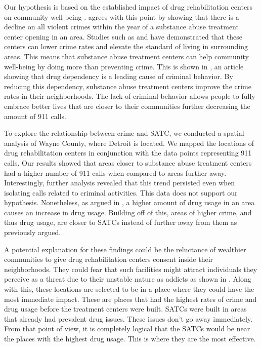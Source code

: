 \documentclass[12pt]{article}
\begin{document}
Our hypothesis is based on the established impact of drug rehabilitation centers on community well-being . \cite{SAT_centers_and_crime} agrees with this point by showing that there is a decline on all violent crimes within the year of a substance abuse treatment center opening in an area.  Studies such as \cite{drugs_and_crime} and \cite{drugs_crime_space_time} have demonstrated that these centers can lower crime rates and elevate the standard of living in surrounding areas. This means that substance abuse treatment centers can help community well-being by doing more than preventing crime. This is shown in \cite{mental_healthcare_and_crime}, an article showing that drug dependency is a leading cause of criminal behavior. By reducing this dependency, substance abuse treatment centers improve the crime rates in their neighborhoods. The lack of criminal behavior allows people to fully embrace better lives that are closer to their communities further decreasing the amount of 911 calls. 

To explore the relationship between crime and SATC, we conducted a spatial analysis of Wayne County, where Detroit is located. We mapped the locations of drug rehabilitation centers in conjunction with the data points representing 911 calls. Our results showed that areas closer to substance abuse treatment centers had a higher number of 911 calls when compared to areas further away.  Interestingly, further analysis revealed that this trend persisted even when isolating calls related to criminal activities. This data does not support our hypothesis. Nonetheless, as argued in \cite{Socioeconomic-Determinants}, a higher amount of drug usage in an area causes an increase in drug usage. Building off of this, areas of higher crime, and thus drug usage, are closer to SATCs instead of further away from them as previously argued. 

A potential explanation for these findings could be the reluctance of wealthier communities to give drug rehabilitation centers consent inside their neighborhoods. They could fear that such facilities might attract individuals they perceive as a threat due to their unstable nature as addicts as shown in \cite{mental_health_and_disability}.  Along with this, these locations are selected to be in a place where they could have the most immediate impact. These are places that had the highest rates of crime and drug usage before the treatment centers were built. SATCs were built in areas that already had prevalent drug issues. These issues don't go away immediately.  From that point of view, it is completely logical that the SATCs would be near the places with the highest drug usage. This is where they are the most effective. 
\end{document}
